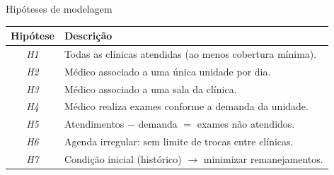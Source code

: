 \begin{frame}{Hipóteses de modelagem}
    \begin{footnotesize}
        \begin{table}
            \centering
            \begin{tabular}{cl}
                \toprule
                \textbf{Hipótese} & \textbf{Descrição} \\
                \midrule
                \textit{H1} & Todas as clínicas atendidas (ao menos cobertura mínima). \\
                \textit{H2} & Médico associado a uma única unidade por dia. \\
                \textit{H3} & Médico associado a uma sala da clínica. \\
                \textit{H4} & Médico realiza exames conforme a demanda da unidade. \\
                \textit{H5} & Atendimentos \(-\) demanda \(=\) exames não atendidos. \\
                \textit{H6} & Agenda irregular: sem limite de trocas entre clínicas. \\
                \textit{H7} & Condição inicial (histórico) \(\rightarrow\) minimizar remanejamentos. \\
                \bottomrule
            \end{tabular}
        \end{table}
    \end{footnotesize}
\end{frame}

